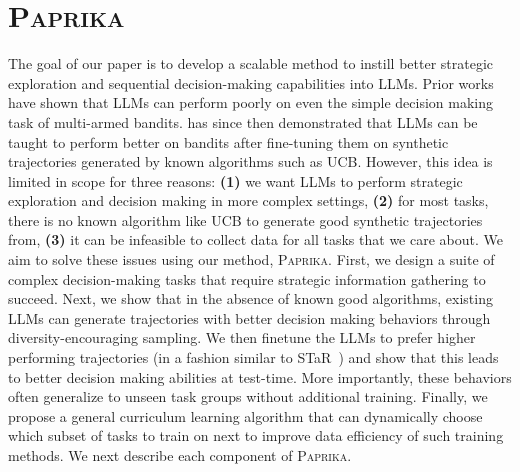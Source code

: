 \documentclass{article}
\newcommand{\ours}[1]{\textsc{Paprika}}
\theoremstyle{plain}
\theoremstyle{definition}
\theoremstyle{remark}
\begin{document}
\section{\ours{}}
The goal of our paper is to develop a scalable method to instill better strategic exploration and sequential decision-making capabilities into LLMs. Prior works~\citep{krishnamurthy2024largelanguagemodelsexplore} have shown that LLMs can perform poorly on even the simple decision making task of multi-armed bandits. \citet{nie2024evolveevaluatingoptimizingllms} has since then demonstrated that LLMs can be taught to perform better on bandits after fine-tuning them on synthetic trajectories generated by known algorithms such as UCB. However, this idea is limited in scope for three reasons: \textbf{(1)} we want LLMs to perform strategic exploration and decision making in more complex settings, \textbf{(2)} for most tasks, there is no known algorithm like UCB to generate good synthetic trajectories from, \textbf{(3)} it can be infeasible to collect data for all tasks that we care about.
We aim to solve these issues using our method, \ours{}. First, we design a suite of complex decision-making tasks that require strategic information gathering to succeed. Next, we show that in the absence of known good algorithms, existing LLMs can generate trajectories with better decision making behaviors through diversity-encouraging sampling. We then finetune the LLMs to prefer higher performing trajectories (in a fashion similar to STaR~\citep{zelikman2022starbootstrappingreasoningreasoning}) and show that this leads to better decision making abilities at test-time. More importantly, these behaviors often generalize to unseen task groups without additional training. Finally, we propose a general curriculum learning algorithm that can dynamically choose which subset of tasks to train on next to improve data efficiency of such training methods. We next describe each component of \ours{}.



\end{document}

